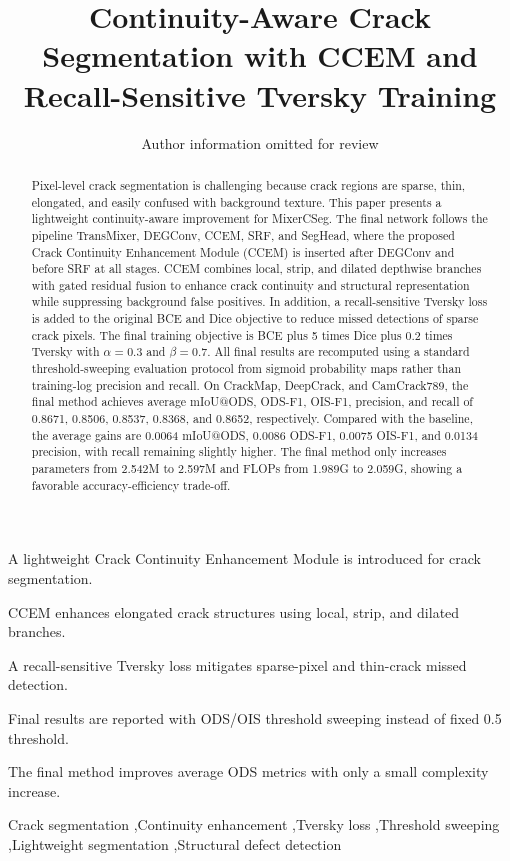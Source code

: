 \documentclass[preprint,12pt]{elsarticle}
\begin{document}
\begin{frontmatter}

\title{Continuity-Aware Crack Segmentation with CCEM and Recall-Sensitive Tversky Training}

\author[inst1]{Author information omitted for review}


\begin{abstract}
Pixel-level crack segmentation is challenging because crack regions are sparse, thin, elongated, and easily confused with background texture. This paper presents a lightweight continuity-aware improvement for MixerCSeg. The final network follows the pipeline TransMixer, DEGConv, CCEM, SRF, and SegHead, where the proposed Crack Continuity Enhancement Module (CCEM) is inserted after DEGConv and before SRF at all stages. CCEM combines local, strip, and dilated depthwise branches with gated residual fusion to enhance crack continuity and structural representation while suppressing background false positives. In addition, a recall-sensitive Tversky loss is added to the original BCE and Dice objective to reduce missed detections of sparse crack pixels. The final training objective is BCE plus 5 times Dice plus 0.2 times Tversky with $\alpha=0.3$ and $\beta=0.7$. All final results are recomputed using a standard threshold-sweeping evaluation protocol from sigmoid probability maps rather than training-log precision and recall. On CrackMap, DeepCrack, and CamCrack789, the final method achieves average mIoU@ODS, ODS-F1, OIS-F1, precision, and recall of 0.8671, 0.8506, 0.8537, 0.8368, and 0.8652, respectively. Compared with the baseline, the average gains are 0.0064 mIoU@ODS, 0.0086 ODS-F1, 0.0075 OIS-F1, and 0.0134 precision, with recall remaining slightly higher. The final method only increases parameters from 2.542M to 2.597M and FLOPs from 1.989G to 2.059G, showing a favorable accuracy-efficiency trade-off.
\end{abstract}

\begin{highlights}
\item A lightweight Crack Continuity Enhancement Module is introduced for crack segmentation.
\item CCEM enhances elongated crack structures using local, strip, and dilated branches.
\item A recall-sensitive Tversky loss mitigates sparse-pixel and thin-crack missed detection.
\item Final results are reported with ODS/OIS threshold sweeping instead of fixed 0.5 threshold.
\item The final method improves average ODS metrics with only a small complexity increase.
\end{highlights}

\begin{keyword}
Crack segmentation \sep Continuity enhancement \sep Tversky loss \sep Threshold sweeping \sep Lightweight segmentation \sep Structural defect detection
\end{keyword}

\end{frontmatter}
\end{document}
